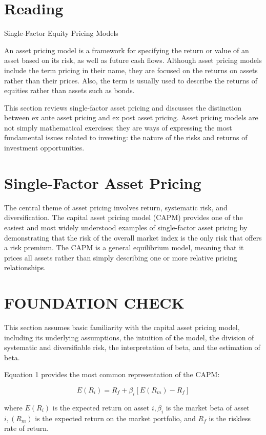 \documentclass[11pt]{article}
\begin{document}
\section*{Reading}
Single-Factor Equity Pricing Models

An asset pricing model is a framework for specifying the return or value of an asset based on its risk, as well as future cash flows. Although asset pricing models include the term pricing in their name, they are focused on the returns on assets rather than their prices. Also, the term is usually used to describe the returns of equities rather than assets such as bonds.

This section reviews single-factor asset pricing and discusses the distinction between ex ante asset pricing and ex post asset pricing. Asset pricing models are not simply mathematical exercises; they are ways of expressing the most fundamental issues related to investing: the nature of the risks and returns of investment opportunities.

\section*{Single-Factor Asset Pricing}
The central theme of asset pricing involves return, systematic risk, and diversification. The capital asset pricing model (CAPM) provides one of the easiest and most widely understood examples of single-factor asset pricing by demonstrating that the risk of the overall market index is the only risk that offers a risk premium. The CAPM is a general equilibrium model, meaning that it prices all assets rather than simply describing one or more relative pricing relationships.

\section*{FOUNDATION CHECK}
This section assumes basic familiarity with the capital asset pricing model, including its underlying assumptions, the intuition of the model, the division of systematic and diversifiable risk, the interpretation of beta, and the estimation of beta.

Equation 1 provides the most common representation of the CAPM:


\begin{equation*}
E\left(R_{i}\right)=R_{f}+\beta_{i}\left[E\left(R_{m}\right)-R_{f}\right] \tag{1}
\end{equation*}


where $E\left(R_{i}\right)$ is the expected return on asset $i, \beta_{i}$ is the market beta of asset $i,\left(R_{m}\right)$ is the expected return on the market portfolio, and $R_{f}$ is the riskless rate of return.
\end{document}

